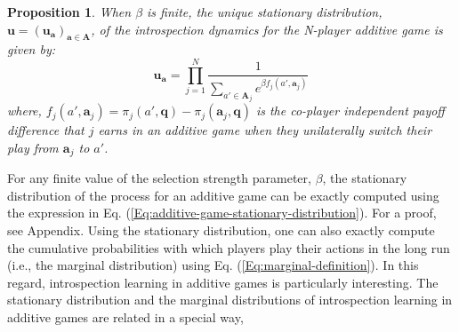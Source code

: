 \documentclass[11pt]{article}
\theoremstyle{plainCl1}
\newtheorem{Prop}{Proposition}
\theoremstyle{plainCl2}
\newcommand{\A}{\mathbf{A}}
\newcommand{\abf}{\mathbf{a}}
\newcommand{\qbf}{\mathbf{q}}
\newcommand{\ubf}{\mathbf{u}}
\begin{document}
 \begin{Prop}
When $\beta$ is finite, the unique stationary distribution, $\ubf = (\ubf_\abf)_{\abf \in \A}$, of the introspection dynamics for the N-player additive game is given by: 
\begin{equation}
\ubf_\abf = \prod_{j=1}^N \frac{1}{\displaystyle \sum_{a' \in \A_j} e^{\beta f_j(a', \abf_j)}} 
\label{Eq:additive-game-stationary-distribution}
\end{equation}
where, $f_j(a', \abf_j) = \pi_j(a', \qbf) - \pi_j(\abf_j, \qbf)$ is the co-player independent payoff difference that $j$  earns in an additive game when they unilaterally switch their play from $\abf_j$  to $a'$.
\label{Th:additive-games-stationary-dist}
\end{Prop}
\noindent For any finite value of the selection strength parameter, $\beta$, the stationary distribution of the process for an additive game can be exactly computed using the expression in Eq. (\ref{Eq:additive-game-stationary-distribution}). For a proof, see Appendix. Using the stationary distribution, one can also exactly compute the cumulative probabilities with which players play their actions in the long run (i.e., the marginal distribution) using Eq. (\ref{Eq:marginal-definition}). In this regard, introspection learning in additive games is particularly interesting. The stationary distribution and the marginal distributions of introspection learning in additive games are related in a special way, 
\end{document}
